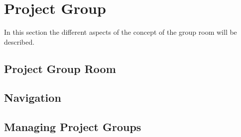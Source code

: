 \section{Project Group}
In this section the different aspects of the concept of the group room will be described.
\subsection{Project Group Room}


\subsection{Navigation}

\subsection{Managing Project Groups}